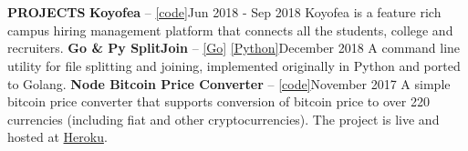 \documentclass[a4paper, 12pt]{article}
\begin{document}
\vspace{-2.2cm}

\section*{}
\begin{vwcol}[widths={0.2, 0.8}, justify=flush, sep=0.7cm, rule=0pt, indent=1em]
\large{\textbf{\textcolor{uclagold}{PROJECTS}}}\newline\newline\newline\newline\newline\newline\newline\newline\newline\newline\newline\newline\newline\newline\newline\newline
\large{\textbf{Koyofea} -- \textcolor{frenchblue}{\href{https://github.com/ImRaviTejaG/koyofea-back}{[code]}}}\hspace{8.4cm}\tiny{Jun 2018 - Sep 2018}\vspace{-0.05cm}\newline
\small{Koyofea is a feature rich campus hiring management platform that connects all the students, college and recruiters.}\vspace{0.3cm}\newline
\large{\textbf{Go \& Py SplitJoin} -- \textcolor{frenchblue}{\href{https://github.com/ImRaviTejaG/go-split-join}{[Go]} \href{https://github.com/ImRaviTejaG/pysj}{[Python]}}}\hspace{4.6cm}\tiny{December 2018}\vspace{-0.05cm}\newline
\small{A command line utility for file splitting and joining, implemented originally in Python and ported to Golang.}\vspace{0.3cm}\newline
\large{\textbf{Node Bitcoin Price Converter} -- \textcolor{frenchblue}{\href{https://github.com/ImRaviTejaG/Node-Bitcoin-Price-Converter}{[code]}}}\hspace{3.5cm}\tiny{November 2017}\vspace{-0.05cm}\newline
\small{A simple bitcoin price converter that supports conversion of bitcoin price to over 220 currencies (including fiat and other cryptocurrencies). The project is live and hosted at \textcolor{frenchblue}{\href{https://btc-price-converter.herokuapp.com}{Heroku}}.}\vspace{0.3cm}\newline
\end{vwcol}
\end{document}
